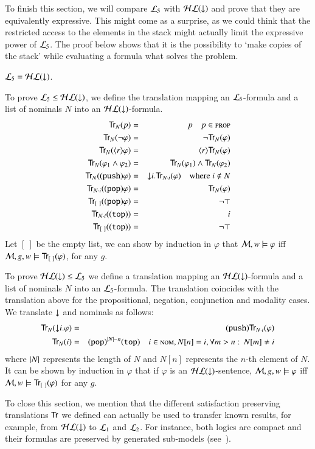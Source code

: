 To finish this section, we will compare $\mathcal{L}_5$ with $\mathcal{HL}({\downarrow})$ and
prove that they are equivalently expressive.  This might come as a
surprise, as we could think that the restricted access to the elements
in the stack might actually limit the expressive power of $\mathcal{L}_5$.
The proof below shows that it is the possibility to `make copies of
the stack' while evaluating a formula what solves the problem.

\begin{thm}\label{prop:stack_leq_hl}
$\mathcal{L}_5 = \mathcal{HL}({\downarrow})$.
\end{thm}

\begin{pf}
To prove $\mathcal{L}_5 \le \mathcal{HL}({\downarrow})$, we define
the translation mapping an $\mathcal{L}_5$-formula and a list of
nominals $N$ into an $\mathcal{HL}({\downarrow})$-formula.
\begin{eqnarray*}
{\sf Tr}_N(p) & = & p \quad p \in \textsc{prop}\\
{\sf Tr}_N(\lnot \varphi) & = & \lnot {\sf Tr}_N(\varphi) \\
{\sf Tr}_N(\langle r \rangle \varphi) & = & \langle r \rangle {\sf Tr}_N(\varphi) \\
{\sf Tr}_N(\varphi_1 \land \varphi_2) & = & {\sf Tr}_N(\varphi_1) \land {\sf Tr}_N(\varphi_2)\\
{\sf Tr}_N({\tt (push)} \varphi) & = & {\downarrow} i. {\sf Tr}_{N\cdot i}(\varphi) \quad
\textrm{where $i \notin N$}\\
{\sf Tr}_{N\cdot i}({\tt (pop)} \varphi) & = & {\sf Tr}_{N}(\varphi)\\
{\sf Tr}_{[\ ]}({\tt (pop)} \varphi) & = & \lnot\top\\
{\sf Tr}_{N\cdot i}({\tt (top)}) & = & i\\
{\sf Tr}_{[\ ]}({\tt (top)}) & = & \lnot\top
\end{eqnarray*}
Let $[\ ]$ be the empty list, we can show
by induction in $\varphi$ that $\mathcal{M}, w \models
\varphi$ iff $\mathcal{M}, g, w \models {\sf Tr}_{[\ ]}(\varphi)$, for any $g$.
\smallskip

To prove $\mathcal{HL}({\downarrow}) \le \mathcal{L}_5$ we define a translation mapping an
$\mathcal{HL}({\downarrow})$-formula and a list of nominals $N$ into an
$\mathcal{L}_5$-formula. The translation coincides with the translation
above for the propositional, negation, conjunction and modality
cases. We translate ${\downarrow}$ and nominals as follows:
\begin{eqnarray*}
{\sf Tr}_N({\downarrow} i.\varphi) & = & {\tt (push)}{\sf Tr}_{N\cdot i}(\varphi)\\
{\sf Tr}_N(i) & = & {\tt (pop)}^{|N|-n}{\tt (top)} \quad i \in \textsc{nom}, N[n]=i,
\forall m>n:\, N[m]\not=i
\end{eqnarray*}
where $|N|$ represents the length of $N$ and $N[n]$ represents
the $n$-th element of $N$. It can be shown by induction in $\varphi$
that if $\varphi$ is an $\mathcal{HL}({\downarrow})$-sentence, $\mathcal{M}, g, w \models
\varphi$ iff $\model, w \models \Tr_{[\ ]}(\varphi)$ for any $g$.
\end{pf}

To close this section, we mention that the different satisfaction preserving
translations ${\sf Tr}$ we defined can actually be used to transfer
known results, for example, from  $\mathcal{HL}({\downarrow})$ to $\mathcal{L}_1$ and
$\mathcal{L}_2$.  For instance, both logics are compact and their formulas
are preserved by generated sub-models (see~\cite{areces01:_hybrid}).
